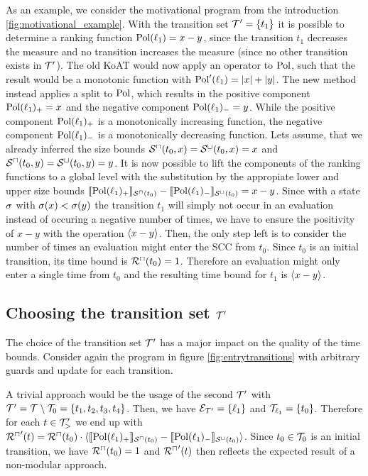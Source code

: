 



As an example, we consider the motivational program from the introduction \ref{fig:motivational_example}.
With the transition set $\mathcal{T}' = \lbrace t_1 \rbrace$ it is possible to determine a ranking function $\text{Pol}(\ell_1) = x - y$, since the transition $t_1$ decreases the measure and no transition increases the measure (since no other transition exists in $\mathcal{T}'$).
The old KoAT would now apply an operator to $\text{Pol}$, such that the result would be a monotonic function with $\text{Pol}'(\ell_1) = \left|x\right| + \left|y\right|$.
The new method instead applies a split to $\text{Pol}$, which results in the positive component $\text{Pol}(\ell_1)_+ = x$ and the negative component $\text{Pol}(\ell_1)_- = y$.
While the positive component $\text{Pol}(\ell_1)_+$ is a monotonically increasing function, the negative component $\text{Pol}(\ell_1)_-$ is a monotonically decreasing function.
Lets assume, that we already inferred the size bounds ${\mathcal{S}^\sqcap}(t_0,x) = {\mathcal{S}^\sqcup}(t_0,x) = x$ and ${\mathcal{S}^\sqcap}(t_0,y) = {\mathcal{S}^\sqcup}(t_0,y) = y$.
It is now possible to lift the components of the ranking functions to a global level with the substitution by the appropiate lower and upper size bounds $\llbracket \text{Pol}(\ell_1)_+ \rrbracket_{{\mathcal{S}^\sqcap}(t_0)} - \llbracket \text{Pol}(\ell_1)_- \rrbracket_{{\mathcal{S}^\sqcup}(t_0)} = x - y$.
Since with a state $\sigma$ with $\sigma(x) < \sigma(y)$ the transition $t_1$ will simply not occur in an evaluation instead of occuring a negative number of times, we have to ensure the positivity of $x - y$ with the operation $\langle x - y\rangle$.
Then, the only step left is to consider the number of times an evaluation might enter the SCC from $t_0$.
Since $t_0$ is an initial transition, its time bound is ${\mathcal{R}^\sqcap}(t_0) = 1$.
Therefore an evaluation might only enter a single time from $t_0$ and the resulting time bound for $t_1$ is $\langle x - y\rangle$.

\subsection{Choosing the transition set $\mathcal{T}'$}

The choice of the transition set $\mathcal{T}'$ has a major impact on the quality of the time bounds.
Consider again the program in figure \ref{fig:entrytransitions} with arbitrary guards and update for each transition.

A trivial approach would be the usage of the second $\mathcal{T}'$ with $\mathcal{T}' = \mathcal{T} \setminus \mathcal{T}_0 = \lbrace t_1, t_2, t_3, t_4 \rbrace$.
Then, we have $\mathcal{E}_{\mathcal{T}'} = \lbrace \ell_1 \rbrace$ and $\mathcal{T}_{\ell_1} = \lbrace t_0 \rbrace$.
Therefore for each $t \in \mathcal{T}'_>$ we end up with ${\mathcal{R}^\sqcap}'(t) = {\mathcal{R}^\sqcap}(t_0) \cdot \langle\llbracket \text{Pol}(\ell_1)_+ \rrbracket_{{\mathcal{S}^\sqcap}(t_0)} - \llbracket \text{Pol}(\ell_1)_- \rrbracket_{{\mathcal{S}^\sqcup}(t_0)}\rangle$.
Since $t_0 \in \mathcal{T}_0$ is an initial transition, we have ${\mathcal{R}^\sqcap}(t_0) = 1$ and ${\mathcal{R}^\sqcap}'(t)$ then reflects the expected result of a non-modular approach.

